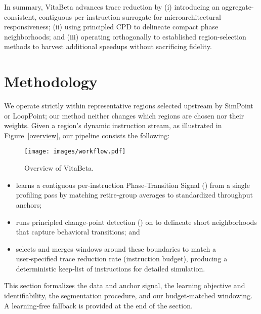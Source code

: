 
In summary, VitaBeta advances trace reduction by (i) introducing an aggregate-consistent, contiguous per-instruction surrogate for microarchitectural responsiveness; (ii) using principled CPD to delineate compact phase neighborhoods; and (iii) operating orthogonally to established region-selection methods to harvest additional speedups without sacrificing fidelity.

 
\section{Methodology}\label{sec:methodology}
We operate strictly within representative regions selected upstream by SimPoint or LoopPoint; our method neither changes which regions are chosen nor their weights. Given a region’s dynamic instruction stream, as illustrated in Figure~\ref{overview}, our pipeline consists the following:

\begin{figure}[!htbp]
    \centering
    \texttt{[image: images/workflow.pdf]}
    \caption{Overview of VitaBeta.}
    \label{fig:placeholder}
\end{figure}
\begin{itemize}
    \item learns a contiguous per‑instruction Phase‑Transition Signal (\pts) from a single profiling pass by matching retire‑group averages to standardized throughput anchors;
    \item runs principled change‑point detection (\cpd) on \pts to delineate short neighborhoods that capture behavioral transitions; and
    \item selects and merges windows around these boundaries to match a user‑specified trace reduction rate (instruction budget), producing a deterministic keep‑list of instructions for detailed simulation.
\end{itemize}
 

This section formalizes the data and anchor signal, the learning objective and identifiability, the segmentation procedure, and our budget‑matched windowing. A learning‑free fallback is provided at the end of the section.

